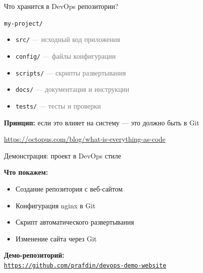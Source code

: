 \documentclass[aspectratio=169]{beamer}
\begin{document}
    \begin{frame}{Что хранится в DevOps репозитории?}
        \begin{center}
            \large
            \texttt{my-project/}
        \end{center}

        \begin{itemize}
            \item \texttt{src/} \textcolor{gray}{— исходный код приложения}
            \item \texttt{config/} \textcolor{gray}{— файлы конфигурации}
            \item \texttt{scripts/} \textcolor{gray}{— скрипты развертывания}
            \item \texttt{docs/} \textcolor{gray}{— документация и инструкции}
            \item \texttt{tests/} \textcolor{gray}{— тесты и проверки}
        \end{itemize}

        \vspace{0.2cm}

        \textbf{Принцип:} если это влияет на систему — это должно быть в Git

        \footnotesize{\textcolor{gray}{\url{https://octopus.com/blog/what-is-everything-as-code}}}
    \end{frame}

    \begin{frame}{Демонстрация: проект в DevOps стиле}

        \textbf{Что покажем:}
        \begin{itemize}
            \item Создание репозитория с веб-сайтом
            \item Конфигурация nginx в Git
            \item Скрипт автоматического развертывания
            \item Изменение сайта через Git
        \end{itemize}
        
        \vspace{0.2cm}
        
        \textbf{Демо-репозиторий:} \\
        \href{https://github.com/prafdin/devops-demo-website}{\texttt{https://github.com/prafdin/devops-demo-website}}
    \end{frame}
\end{document}
